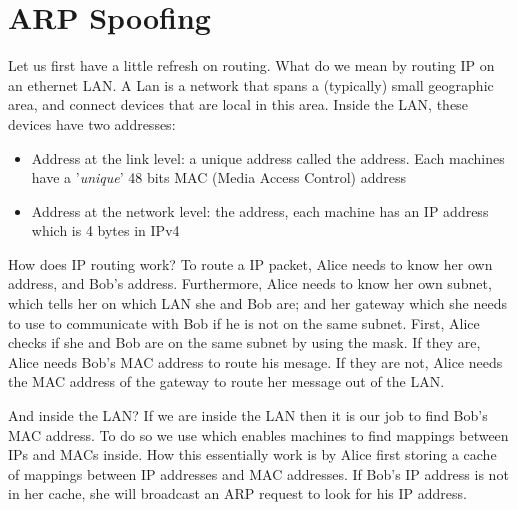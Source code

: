 \section{ARP Spoofing}
Let us first have a little refresh on routing. What do we mean by routing IP on an ethernet LAN. A Lan is a network that spans a (typically) small geographic area, and connect devices that are local in this area. Inside the LAN, these devices have two addresses:
\begin{itemize}
    \item Address at the link level: a unique address called the  address. Each machines have a '\textit{unique}' 48 bits MAC (Media Access Control) address
    \item Address at the network level: the  address, each machine has an IP address which is 4 bytes in IPv4
\end{itemize}
\begin{parag}{How does IP routing work?}
    To route a IP packet, Alice needs to know her own address, and Bob's address. Furthermore, Alice needs to know her own subnet, which tells her on which LAN she and Bob are; and her gateway which she needs to use to communicate with Bob if he is not on the same subnet. First, Alice checks if she and Bob are on the same subnet by using the mask. If they are, Alice needs Bob's MAC address to route his mesage. If they are not, Alice needs the MAC address of the gateway to route her message out of the LAN.
\end{parag}
\begin{parag}{And inside the LAN?}
    If we are inside the LAN then it is our job to find Bob's MAC address. To do so we use  which enables machines to find mappings between IPs and MACs inside. How this essentially work is by Alice first storing a cache of mappings between IP addresses and MAC addresses. If Bob's IP address is not in her cache, she will broadcast an ARP request to look for his IP address.
\end{parag}

